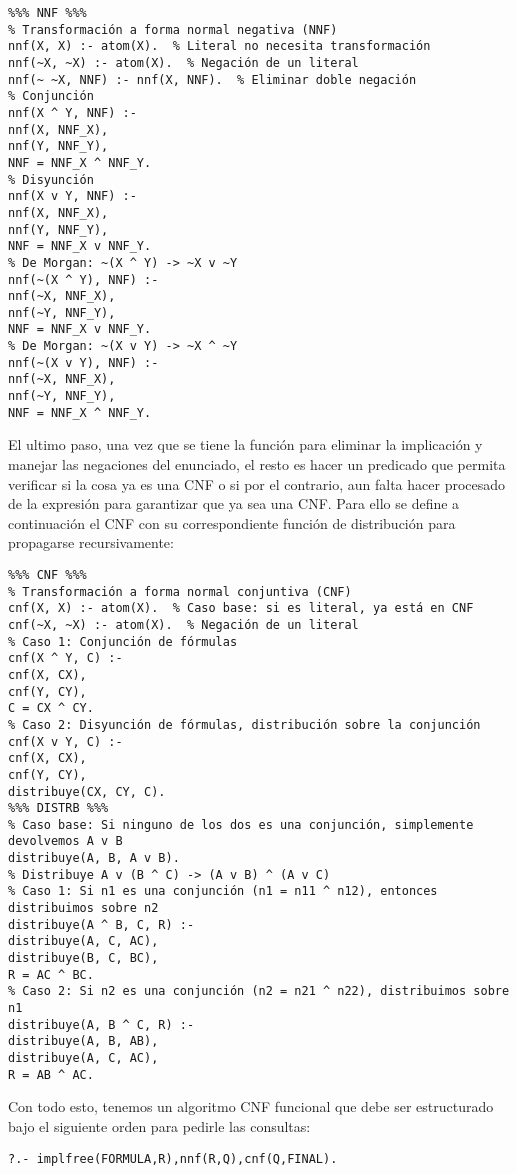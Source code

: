 \documentclass[11pt, letterpaper]{article}
\begin{document}
\begin{verbatim}
%%% NNF %%%
% Transformación a forma normal negativa (NNF)
nnf(X, X) :- atom(X).  % Literal no necesita transformación
nnf(~X, ~X) :- atom(X).  % Negación de un literal
nnf(~ ~X, NNF) :- nnf(X, NNF).  % Eliminar doble negación
% Conjunción
nnf(X ^ Y, NNF) :- 
nnf(X, NNF_X),
nnf(Y, NNF_Y),
NNF = NNF_X ^ NNF_Y.  
% Disyunción
nnf(X v Y, NNF) :- 
nnf(X, NNF_X),
nnf(Y, NNF_Y),
NNF = NNF_X v NNF_Y.  
% De Morgan: ~(X ^ Y) -> ~X v ~Y
nnf(~(X ^ Y), NNF) :- 
nnf(~X, NNF_X),
nnf(~Y, NNF_Y),
NNF = NNF_X v NNF_Y.  
% De Morgan: ~(X v Y) -> ~X ^ ~Y
nnf(~(X v Y), NNF) :- 
nnf(~X, NNF_X),
nnf(~Y, NNF_Y),
NNF = NNF_X ^ NNF_Y.  

\end{verbatim}

\newpage

El ultimo paso, una vez que se tiene la función para eliminar la implicación y manejar las negaciones del enunciado, el resto es hacer un predicado que permita verificar si la cosa ya es una CNF o si por el contrario, aun falta hacer procesado de la expresión para garantizar que ya sea una CNF. Para ello se define a continuación el CNF con su correspondiente función de distribución para propagarse recursivamente:

\begin{verbatim}
%%% CNF %%%
% Transformación a forma normal conjuntiva (CNF)
cnf(X, X) :- atom(X).  % Caso base: si es literal, ya está en CNF
cnf(~X, ~X) :- atom(X).  % Negación de un literal
% Caso 1: Conjunción de fórmulas
cnf(X ^ Y, C) :- 
cnf(X, CX),
cnf(Y, CY),
C = CX ^ CY.
% Caso 2: Disyunción de fórmulas, distribución sobre la conjunción
cnf(X v Y, C) :- 
cnf(X, CX),
cnf(Y, CY),
distribuye(CX, CY, C).
%%% DISTRB %%%
% Caso base: Si ninguno de los dos es una conjunción, simplemente devolvemos A v B
distribuye(A, B, A v B).
% Distribuye A v (B ^ C) -> (A v B) ^ (A v C)
% Caso 1: Si n1 es una conjunción (n1 = n11 ^ n12), entonces distribuimos sobre n2
distribuye(A ^ B, C, R) :-
distribuye(A, C, AC),
distribuye(B, C, BC),
R = AC ^ BC.
% Caso 2: Si n2 es una conjunción (n2 = n21 ^ n22), distribuimos sobre n1
distribuye(A, B ^ C, R) :-
distribuye(A, B, AB),
distribuye(A, C, AC),
R = AB ^ AC.
\end{verbatim}

Con todo esto, tenemos un algoritmo CNF funcional que debe ser estructurado bajo el siguiente orden para pedirle las consultas:

\begin{verbatim}
?.- implfree(FORMULA,R),nnf(R,Q),cnf(Q,FINAL).

\end{verbatim}
\end{document}
